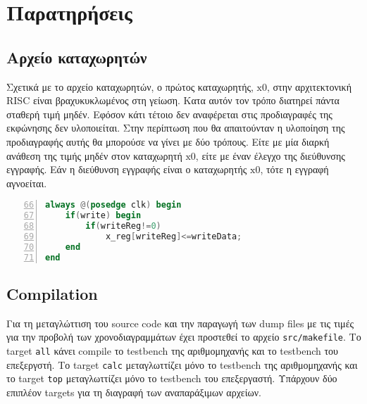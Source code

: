 \section{Παρατηρήσεις}

\subsection{Αρχείο καταχωρητών}
Σχετικά με το αρχείο καταχωρητών, ο πρώτος καταχωρητής, $\text{x}0$, στην αρχιτεκτονική RISC είναι βραχυκυκλωμένος στη γείωση. Κατα αυτόν τον τρόπο διατηρεί πάντα σταθερή τιμή μηδέν. Εφόσον κάτι τέτοιο δεν αναφέρεται στις προδιαγραφές της εκφώνησης δεν υλοποιείται. Στην περίπτωση που θα απαιτούνταν η υλοποίηση της προδιαγραφής αυτής θα μπορούσε να γίνει με δύο τρόπους. Είτε με μία διαρκή ανάθεση της τιμής μηδέν στον καταχωρητή $\text{x}0$, είτε με έναν έλεγχο της διεύθυνσης εγγραφής. Εάν η διεύθυνση εγγραφής είναι ο καταχωρητής $\text{x}0$, τότε η εγγραφή αγνοείται.

\begin{center}
\begin{lstlisting}[language=Verilog,tabsize=2,caption={Τροποποίηση του αρχείου καταχωρητών ώστε ο $\text{x}0$ να είναι βραχυκυκλωμένος στη γείωση.},numbers=left,firstnumber=66,basicstyle=\ttfamily,xleftmargin=2em]
always @(posedge clk) begin
	if(write) begin
		if(writeReg!=0)
			x_reg[writeReg]<=writeData;
	end
end
\end{lstlisting}
\end{center}

\subsection{Compilation}
Για τη μεταγλώττιση του source code και την παραγωγή των dump files με τις τιμές για την προβολή των χρονοδιαγραμμάτων έχει προστεθεί το αρχείο \texttt{src/makefile}. Το target \texttt{all} κάνει compile το testbench της αριθμομηχανής και το testbench του επεξεργστή. Το target \texttt{calc} μεταγλωττίζει μόνο το testbench της αριθμομηχανής και το target \texttt{top} μεταγλωττίζει μόνο το testbench του επεξεργαστή. Υπάρχουν δύο επιπλέον targets για τη διαγραφή των αναπαράξιμων αρχείων.\par